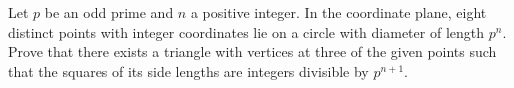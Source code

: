 Let $p$ be an odd prime and $n$ a positive integer. In the coordinate plane, eight distinct points with integer coordinates lie on a circle with diameter of length $p^n$. Prove that there exists a triangle with vertices at three of the given points such that the squares of its side lengths are integers divisible by $p^{n+1}$.
